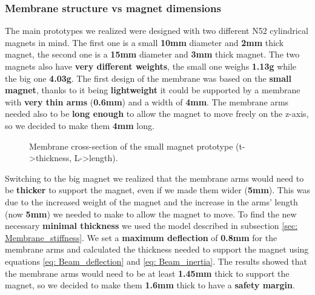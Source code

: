 \subsubsection{Membrane structure vs magnet dimensions}
The main prototypes we realized were designed with two different N52 cylindrical magnets in mind.
The first one is a small \textbf{10mm} diameter and \textbf{2mm} thick magnet, the second one is a \textbf{15mm} diameter and \textbf{3mm} thick magnet.
The two magnets also have \textbf{very different weights}, the small one weighs \textbf{1.13g} while the big one \textbf{4.03g}.
The first design of the membrane was based on the \textbf{small magnet}, thanks to it being \textbf{lightweight} it could be supported by a membrane with \textbf{very thin arms} (\textbf{0.6mm}) and a width of \textbf{4mm}.
The membrane arms needed also to be \textbf{long enough} to allow the magnet to move freely on the z-axis, so we decided to make them \textbf{4mm} long.
\begin{figure}[H]
    \centering
    \caption{Membrane cross-section of the small magnet prototype (t->thickness, L->length).}
    \label{fig: Membrane_v1_section}
\end{figure}

Switching to the big magnet we realized that the membrane arms would need to be \textbf{thicker} to support the magnet, even if we made them wider (\textbf{5mm}).
This was due to the increased weight of the magnet and the increase in the arms' length (now \textbf{5mm}) we needed to make to allow the magnet to move.
To find the new necessary \textbf{minimal thickness} we used the model described in subsection \ref{sec: Membrane_stiffness}.
We set a \textbf{maximum deflection} of \textbf{0.8mm} for the membrane arms and calculated the thickness needed to support the magnet using equations \ref{eq: Beam_deflection} and \ref{eq: Beam_inertia}.
The results showed that the membrane arms would need to be at least \textbf{1.45mm} thick to support the magnet, so we decided to make them \textbf{1.6mm} thick to have a \textbf{safety margin}.

